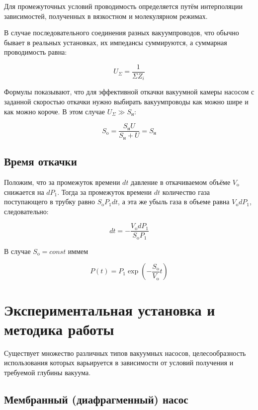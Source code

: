 \documentclass[a4paper, 12pt]{article} %
\begin{document}
Для промежуточных условий проводимость определяется путём
интерполяции зависимостей, полученных в вязкостном и молекулярном
режимах.

В случае последовательного соединения разных вакуумпроводов,
что обычно бывает в реальных установках, их импедансы суммируются,
а суммарная проводимость равна:

\begin{equation}
    U_{\Sigma} = \frac{1}{\Sigma Z_{i}}
\end{equation}

Формулы показывают, что для эффективной
откачки вакуумной камеры насосом с заданной скоростью откачки нужно
выбирать вакуумпроводы как можно шире и как можно короче. В этом
случае $U_{\Sigma} \gg S_{\text{н}}$:

\begin{equation}
    S_{\text{o}} = \frac{S_{\text{н}} U}{S_{\text{н}} + U} = S_{\text{н}}
\end{equation}

\subsection{Время откачки}

Положим, что за промежуток времени $dt$ давление
в откачиваемом объёме $V_{\text{o}}$ снижается на $dP_1$. Тогда за промежуток времени $dt$ количество газа поступающего в трубку равно $S_{\text{o}} P_1 dt$, а эта же
убыль газа в объеме равна $V_{\text{o}} dP_1$, следовательно:

\begin{equation}
    dt = - \frac{V_{\text{o}} dP_1}{S_{\text{o}}P_1}
\end{equation}

В случае $S_{\text{o}} = const$ иммем 

\begin{equation}
    P(t) = P_1 \exp \left( - \frac{S_{\text{o}}}{V_{\text{o}}}t \right)
\end{equation}


\section{Экспериментальная установка и методика работы}

Существует множество различных типов вакуумных насосов, целесообразность использования которых варьируется в зависимости от условий получения и требуемой глубины вакуума.

\subsection{Мембранный (диафрагменный) насос}
\end{document}
